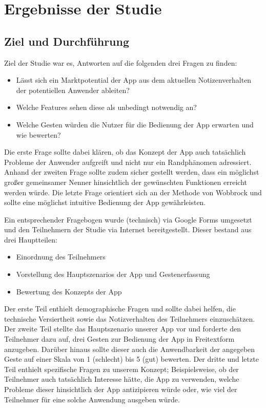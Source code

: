 \documentclass{chi-ext}
\begin{document}
\section{Ergebnisse der Studie}

\subsection{Ziel und Durchführung}
Ziel der Studie war es, Antworten auf die folgenden drei Fragen zu finden:
\begin{itemize}
\item Lässt sich ein Marktpotential der App aus dem aktuellen Notizenverhalten der potentiellen Anwender ableiten?
\item Welche Features sehen diese als unbedingt notwendig an?
\item Welche Gesten würden die Nutzer für die Bedienung der App erwarten und wie bewerten?
\end{itemize}

Die erste Frage sollte dabei klären, ob das Konzept der App auch tatsächlich Probleme der Anwender aufgreift und nicht nur ein Randphänomen adressiert. Anhand der zweiten Frage sollte zudem sicher gestellt werden, dass ein möglichst großer gemeinsamer Nenner hinsichtlich der gewünschten Funktionen erreicht werden würde. Die letzte Frage orientiert sich an der Methode von Wobbrock \cite{Wobbrock} und sollte eine möglichst intuitive Bedienung der App gewährleisten.

Ein entsprechender Fragebogen wurde (technisch) via Google Forms umgesetzt und den Teilnehmern der Studie via Internet bereitgestellt. Dieser bestand aus drei Hauptteilen:

\begin{itemize}
\item Einordnung des Teilnehmers
\item Vorstellung des Hauptszenarios der App und Gestenerfassung
\item Bewertung des Konzepts der App
\end{itemize}

Der erste Teil enthielt demographische Fragen und sollte dabei helfen, die technische Versiertheit sowie das Notizverhalten des Teilnehmers einzuschätzen.
Der zweite Teil stellte das Hauptszenario unserer App vor und forderte den Teilnehmer dazu auf, drei Gesten zur Bedienung der App in Freitextform anzugeben. Darüber hinaus sollte dieser auch die Anwendbarkeit der angegeben Geste auf einer Skala von 1 (schlecht) bis 5 (gut) bewerten.
Der dritte und letzte Teil enthielt spezifische Fragen zu unserem Konzept; Beispielsweise, ob der Teilnehmer auch tatsächlich Interesse hätte, die App zu verwenden, welche Probleme dieser hinsichtlich der App antizipieren würde oder, wie viel der Teilnehmer für eine solche Anwendung ausgeben würde.
\end{document}
